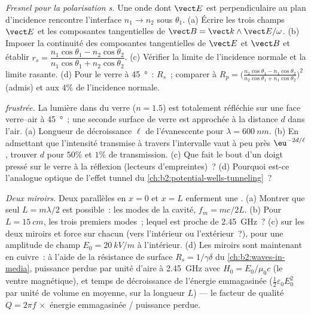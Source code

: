 \begin{exercise}[$\star\star\star$]\label{exo:b2:wave-interfaces:10}
\emph{Fresnel pour la polarisation s.} Une onde dont $\vect E$ est perpendiculaire
au plan d'incidence rencontre l'interface $n_1 \to n_2$ sous $\theta_1$.
(a) Écrire les trois champs $\vect E$ et les composantes tangentielles de
$\vect B = \vect k\wedge\vect E/\omega$. (b) Imposer la continuité des composantes tangentielles de
$\vect E$ et $\vect B$ et établir $r_s = \dfrac{n_1\cos\theta_1 - n_2\cos\theta_2}
{n_1\cos\theta_1 + n_2\cos\theta_2}$. (c) Vérifier la limite de l'incidence normale et la
limite rasante. (d) Pour le verre à \qty{45}{\degree}~: $R_s$~; comparer à $R_p
= \bigl(\frac{n_2\cos\theta_1 - n_1\cos\theta_2}{n_2\cos\theta_1 + n_1\cos\theta_2}\bigr)^2$
(admis) et aux $4\%$ de l'incidence normale.
\end{exercise}

\begin{exercise}[$\star\star\star$]\label{exo:b2:wave-interfaces:11}
\emph{ frustrée.} La lumière dans du verre ($n = 1.5$) est
totalement réfléchie sur une face verre--air à \qty{45}{\degree}~; une seconde surface
de verre est approchée à la distance $d$ dans l'air. (a) Longueur de décroissance
$\ell$ de l'évanescente pour $\lambda = \qty{600}{nm}$. (b) En admettant que l'intensité
transmise à travers l'intervalle vaut à peu près $\eu^{-2d/\ell}$, trouver $d$ pour $50\%$
et $1\%$ de transmission. (c) Que fait le bout d'un doigt pressé sur le verre
à la réflexion (lecteurs d'empreintes)~? (d) Pourquoi est-ce l'analogue
optique de l'effet tunnel du
\cref{ch:b2:potential-wells-tunneling}~?
\end{exercise}

\begin{exercise}[$\star\star\star$]\label{exo:b2:wave-interfaces:12}
\emph{Deux miroirs.} Deux  parallèles en $x = 0$ et $x =
L$ enferment une . (a) Montrer que seul $L = m\lambda/2$ est possible~:
les modes de la cavité, $f_m = mc/2L$. (b) Pour $L = \qty{15}{cm}$, les trois
premiers modes~; lequel est proche de \qty{2.45}{GHz}~? (c)  sur les
deux miroirs et force sur chacun (vers l'intérieur ou l'extérieur~?), pour une amplitude de champ
$E_0 = \qty{20}{kV/m}$ à l'intérieur. (d) Les miroirs sont maintenant en cuivre~:
à l'aide de la résistance de surface $R_s = 1/\gamma\delta$ du
\cref{ch:b2:waves-in-media}, puissance perdue par unité d'aire à
\qty{2.45}{GHz} avec $H_0 = E_0/\mu_0c$ (le ventre magnétique), et temps de décroissance de l'énergie
emmagasinée ($\tfrac12\varepsilon_0E_0^2$ par unité de volume en moyenne, sur la longueur $L$)
--- le facteur de qualité $Q = 2\pi f\,\times$ énergie emmagasinée / puissance perdue.
\end{exercise}

